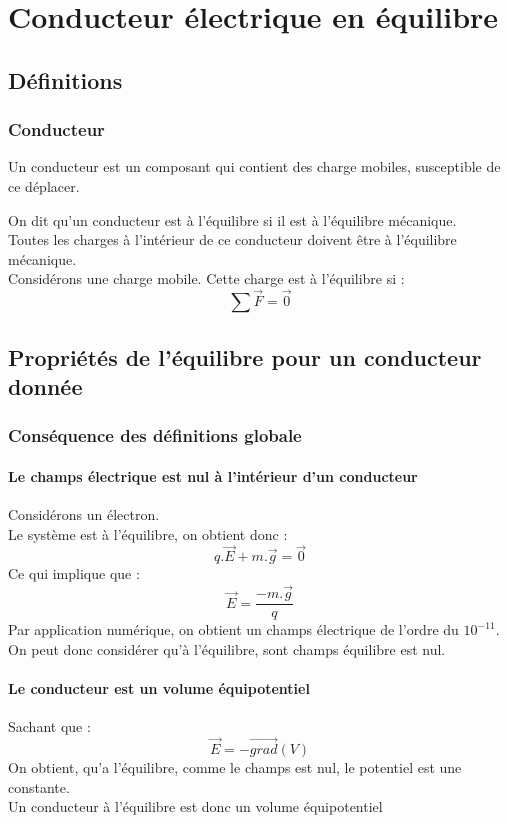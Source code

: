 \chapter{Conducteur électrique en équilibre}
\section{Définitions}
\subsection{Conducteur}
\begin{de}
Un conducteur est un composant qui contient des charge mobiles, susceptible de ce déplacer.
\end{de}
\begin{de}
On dit qu'un conducteur est à l'équilibre si il est à l'équilibre mécanique.\\
Toutes les charges à l'intérieur de ce conducteur doivent être à l'équilibre mécanique.\\
Considérons une charge mobile. Cette charge est à l'équilibre si :
$$\sum \overrightarrow{F} = \overrightarrow{0}$$
\end{de}
\section{Propriétés de l'équilibre pour un conducteur donnée}
\subsection{Conséquence des définitions globale}
\subsubsection{Le champs électrique est nul à l'intérieur d'un conducteur}
Considérons un électron.\\
Le système est à l'équilibre, on obtient donc : 
$$q.\overrightarrow{E}+m.\overrightarrow{g} = \overrightarrow{0}$$
Ce qui implique que : 
$$\overrightarrow{E} = \dfrac{-m.\overrightarrow{g}}{q}$$
Par application numérique, on obtient un champs électrique de l'ordre du $10^{-11}$.\\
On peut donc considérer qu'à l'équilibre, sont champs équilibre est nul.
\subsubsection{Le conducteur est un volume équipotentiel}
Sachant que :
$$\overrightarrow{E} = -\overrightarrow{grad}(V)$$
On obtient, qu'a l'équilibre, comme le champs est nul, le potentiel est une constante.\\
Un conducteur à l'équilibre est donc un volume équipotentiel
